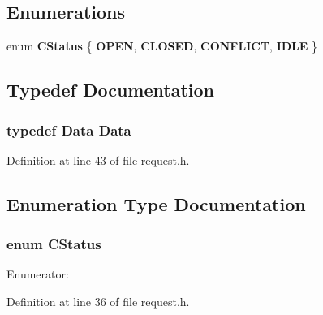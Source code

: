 \subsection*{Enumerations}
\begin{CompactItemize}
\item 
enum {\bf CStatus} \{ {\bf OPEN}, 
{\bf CLOSED}, 
{\bf CONFLICT}, 
{\bf IDLE}
 \}
\end{CompactItemize}


\subsection{Typedef Documentation}
\subsubsection[{Data}]{\setlength{\rightskip}{0pt plus 5cm}typedef {\bf Data} {\bf Data}}\label{request_8h_040fc07acd6f92cd77e65c471e177c8a}




Definition at line 43 of file request.h.

\subsection{Enumeration Type Documentation}
\subsubsection[{CStatus}]{\setlength{\rightskip}{0pt plus 5cm}enum {\bf CStatus}}\label{request_8h_8d135869d04d8d8c55c0e45752845cf0}


\begin{Desc}
\item[Enumerator: ]\par
\begin{description}
\item[{\em 
OPEN\label{request_8h_8d135869d04d8d8c55c0e45752845cf00e0143636c29971736eab47415868eae}
}]\item[{\em 
CLOSED\label{request_8h_8d135869d04d8d8c55c0e45752845cf0929f0327e17604ce9713b2a6117bd603}
}]\item[{\em 
CONFLICT\label{request_8h_8d135869d04d8d8c55c0e45752845cf03124eeef4801cbb117a96b9e4a0d7eb7}
}]\item[{\em 
IDLE\label{request_8h_8d135869d04d8d8c55c0e45752845cf0fd6a0e4343048b10646dd2976cc5ad18}
}]\end{description}
\end{Desc}



Definition at line 36 of file request.h.